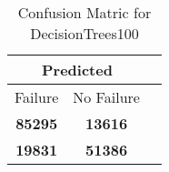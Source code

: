 \begin{table}[] 
\caption{Confusion Matric for DecisionTrees100} 
\label{Table: Prediction Accuracy-DMDDecisionTrees100OnlySunEKF-ignoreReflectionEKF-top2-Reflection} 
\centering 
\begin{tabular} 
 {@{}ccc@{}} 
\toprule 
\multicolumn{2}{c}{\textbf{Predicted}}
 \\ \midrule 
\multicolumn{1}{|c|}{Failure} & 
\multicolumn{1}{c|}{No Failure}
 \\ \midrule 
\multicolumn{1}{|c|}{\color{green}\textbf{85295}} & 
\multicolumn{1}{c|}{\color{red}\textbf{13616}}
 \\ \midrule 
\multicolumn{1}{|c|}{\color{red}\textbf{19831}} & 
\multicolumn{1}{c|}{\color{green}\textbf{51386}}
 \\ \bottomrule 
\end{tabular} 
\end{table} 
